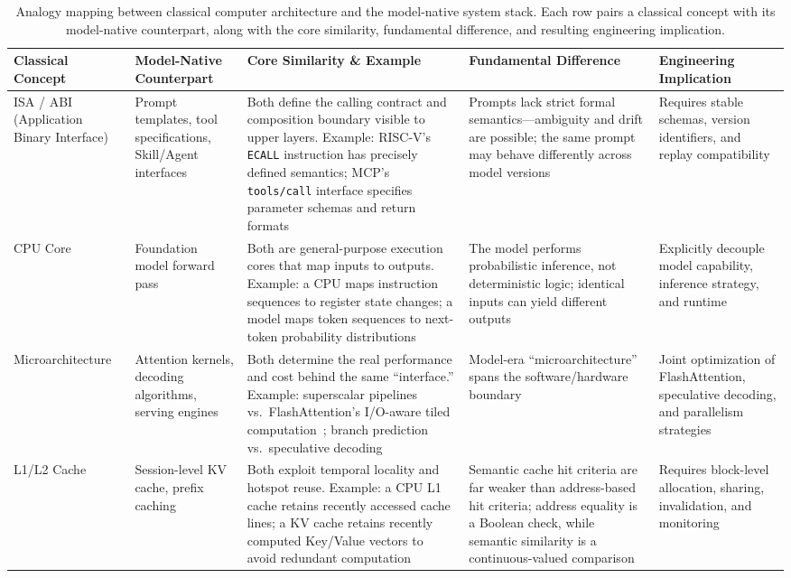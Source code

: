 \documentclass[11pt,a4paper]{article}
\begin{document}
\begin{table}[t]
\centering
\footnotesize
\caption{Analogy mapping between classical computer architecture and the model-native system stack. Each row pairs a classical concept with its model-native counterpart, along with the core similarity, fundamental difference, and resulting engineering implication.}
\label{tab:mapping}
\begin{tabularx}{\textwidth}{p{}p{}Y Y Y}
\toprule
Classical Concept & Model-Native Counterpart & Core Similarity \& Example & Fundamental Difference & Engineering Implication \\
\midrule
ISA / ABI (Application Binary Interface) & Prompt templates, tool specifications, Skill/Agent interfaces & Both define the calling contract and composition boundary visible to upper layers. Example: RISC-V's \texttt{ECALL} instruction has precisely defined semantics\cite{riscv_spec_2026}; MCP's \texttt{tools/call} interface specifies parameter schemas and return formats\cite{mcp_intro_2026} & Prompts lack strict formal semantics---ambiguity and drift are possible; the same prompt may behave differently across model versions & Requires stable schemas, version identifiers, and replay compatibility \\
CPU Core & Foundation model forward pass & Both are general-purpose execution cores that map inputs to outputs. Example: a CPU maps instruction sequences to register state changes; a model maps token sequences to next-token probability distributions\cite{vaswani2017attention,brown2020gpt3} & The model performs probabilistic inference, not deterministic logic; identical inputs can yield different outputs & Explicitly decouple model capability, inference strategy, and runtime \\
Microarchitecture & Attention kernels, decoding algorithms, serving engines & Both determine the real performance and cost behind the same ``interface.'' Example: superscalar pipelines vs.\ FlashAttention's I/O-aware tiled computation~\cite{dao2022flashattention}; branch prediction vs.\ speculative decoding\cite{leviathan2023speculative} & Model-era ``microarchitecture'' spans the software/hardware boundary & Joint optimization of FlashAttention, speculative decoding, and parallelism strategies \\
L1/L2 Cache & Session-level KV cache, prefix caching & Both exploit temporal locality and hotspot reuse. Example: a CPU L1 cache retains recently accessed cache lines; a KV cache retains recently computed Key/Value vectors to avoid redundant computation\cite{kwon2023pagedattention,vllm_prefix_2026} & Semantic cache hit criteria are far weaker than address-based hit criteria; address equality is a Boolean check, while semantic similarity is a continuous-valued comparison & Requires block-level allocation, sharing, invalidation, and monitoring \\

\end{tabularx}
\end{table}
\end{document}
